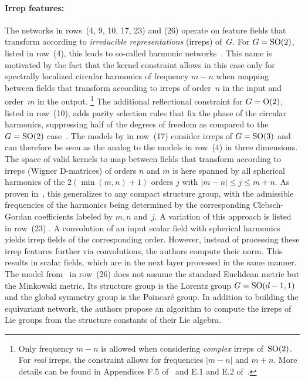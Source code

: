 \paragraph{Irrep features:}
The networks in rows~(4, 9, 10, 17, 23) and (26) operate on feature fields that transform according to \emph{irreducible representations} (irreps) of~$G$.
For $G=\operatorname{SO}(2)$, listed in row~(4), this leads to so-called harmonic networks~\cite{Worrall2017-HNET,Weiler2019_E2CNN}.
This name is motivated by the fact that the kernel constraint allows in this case only for spectrally localized circular harmonics of frequency $m-n$ when mapping between fields that transform according to irreps of order~$n$ in the input and order~$m$ in the output.%
\footnote{
    Only frequency $m-n$ is allowed when considering \emph{complex} irreps of~$\operatorname{SO}(2)$.
    For \emph{real} irreps, the constraint allows for frequencies $|m-n|$ and $m+n$.
    More details can be found in Appendices F.5 of~\cite{Weiler2019_E2CNN} and E.1 and E.2 of~\cite{lang2020WignerEckart}.
}
The additional reflectional constraint for $G=\operatorname{O}(2)$, listed in row~(10), adds parity selection rules that fix the phase of the circular harmonics, suppressing half of the degrees of freedom as compared to the $G=\operatorname{SO}(2)$ case~\cite{Weiler2019_E2CNN}.
The models by \cite{3d_steerableCNNs,Thomas2018-TFN,miller2020relevance,Kondor2018-NBN,anderson2019cormorant} in row~(17) consider irreps of $G=\operatorname{SO}(3)$ and can therefore be seen as the analog to the models in row~(4) in three dimensions.
The space of valid kernels to map between fields that transform according to irreps (Wigner D-matrices) of orders $n$ and $m$ is here spanned by all spherical harmonics of the $2(\min(m,n)+1)$ orders $j$ with $|m-n| \leq j \leq m+n$.
As proven in~\cite{lang2020WignerEckart}, this generalizes to any compact structure group, with the admissible frequencies of the harmonics being determined by the corresponding Clebsch-Gordan coefficients labeled by $m,n$ and~$j$.
A variation of this approach is listed in row~(23) \cite{poulenard2019effective}.
A convolution of an input scalar field with spherical harmonics yields irrep fields of the corresponding order.
However, instead of processing these irrep features further via convolutions, the authors compute their norm.
This results in scalar fields, which are in the next layer processed in the same manner.
The model from~\cite{shutty2020learning} in row~(26) does not assume the standard Euclidean metric but the Minkowski metric.
Its structure group is the Lorentz group $G=\operatorname{SO}(d-1,1)$ and the global symmetry group is the Poincar\'{e} group.
In addition to building the equivariant network, the authors propose an algorithm to compute the irreps of Lie groups from the structure constants of their Lie algebra.


